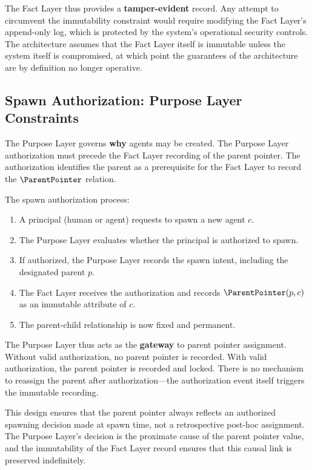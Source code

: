 The Fact Layer thus provides a \textbf{tamper-evident} record. Any attempt to circumvent the immutability constraint would require modifying the Fact Layer's append-only log, which is protected by the system's operational security controls. The architecture assumes that the Fact Layer itself is immutable unless the system itself is compromised, at which point the guarantees of the architecture are by definition no longer operative.

\subsection{Spawn Authorization: Purpose Layer Constraints}

The Purpose Layer governs \textbf{why} agents may be created. The Purpose Layer authorization must precede the Fact Layer recording of the parent pointer. The authorization identifies the parent as a prerequisite for the Fact Layer to record the $\ParentPointer$ relation.

The spawn authorization process:

\begin{enumerate}
    \item A principal (human or agent) requests to spawn a new agent $c$.
    \item The Purpose Layer evaluates whether the principal is authorized to spawn.
    \item If authorized, the Purpose Layer records the spawn intent, including the designated parent $p$.
    \item The Fact Layer receives the authorization and records $\ParentPointer(p, c)$ as an immutable attribute of $c$.
    \item The parent-child relationship is now fixed and permanent.
\end{enumerate}

The Purpose Layer thus acts as the \textbf{gateway} to parent pointer assignment. Without valid authorization, no parent pointer is recorded. With valid authorization, the parent pointer is recorded and locked. There is no mechanism to reassign the parent after authorization—the authorization event itself triggers the immutable recording.

This design ensures that the parent pointer always reflects an authorized spawning decision made at spawn time, not a retrospective post-hoc assignment. The Purpose Layer's decision is the proximate cause of the parent pointer value, and the immutability of the Fact Layer record ensures that this causal link is preserved indefinitely.

